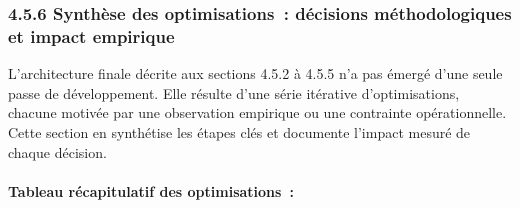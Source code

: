 \subsubsection*{4.5.6 \quad Synth\`ese des optimisations~: d\'ecisions m\'ethodologiques et impact empirique}

L'architecture finale d\'ecrite aux sections 4.5.2 \`a 4.5.5 n'a pas \'emerg\'e
d'une seule passe de d\'eveloppement. Elle r\'esulte d'une s\'erie it\'erative
d'optimisations, chacune motiv\'ee par une observation empirique ou une contrainte
op\'erationnelle. Cette section en synth\'etise les \'etapes clés et documente
l'impact mesur\'e de chaque d\'ecision.

\paragraph{Tableau r\'ecapitulatif des optimisations~:}

